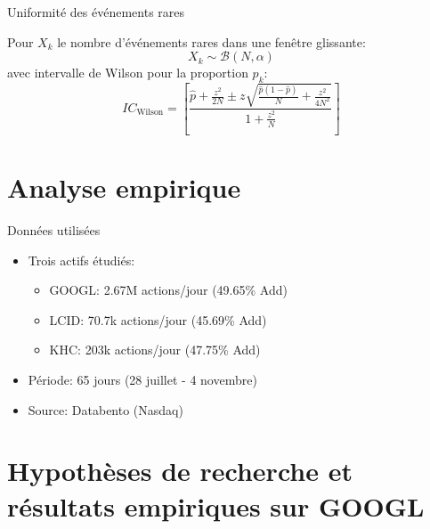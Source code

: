 \documentclass[aspectratio=169]{beamer}  %
\begin{document}
\begin{frame}{Uniformité des événements rares}
    \begin{theorem}
        Pour $X_k$ le nombre d'événements rares dans une fenêtre glissante:
        \[X_k \sim \mathcal{B}(N, \alpha)\]
        avec intervalle de Wilson pour la proportion $p_k$:
        \[IC_{\text{Wilson}} = \left[ \frac{\hat{p} + \frac{z^2}{2N} \pm z \sqrt{\frac{\hat{p}(1-\hat{p})}{N} + \frac{z^2}{4N^2}}}{1 + \frac{z^2}{N}} \right]\]
    \end{theorem}
\end{frame}

\section{Analyse empirique}

\begin{frame}{Données utilisées}
    \begin{itemize}
        \item Trois actifs étudiés:
        \begin{itemize}
            \item GOOGL: 2.67M actions/jour (49.65\% Add)
            \item LCID: 70.7k actions/jour (45.69\% Add)
            \item KHC: 203k actions/jour (47.75\% Add)
        \end{itemize}
        \item Période: 65 jours (28 juillet - 4 novembre)
        \item Source: Databento (Nasdaq)
    \end{itemize}
\end{frame}

\section{Hypothèses de recherche et résultats empiriques sur GOOGL}
\end{document}

